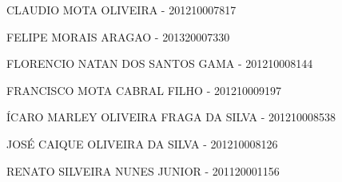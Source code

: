 \clearpage{\centering
\textbf{\textcolor[rgb]{0.078431375,0.09411765,0.13725491}{Componentes}}\textcolor[rgb]{0.078431375,0.09411765,0.13725491}{:}
\par}


\bigskip

{\centering
\textcolor[rgb]{0.078431375,0.09411765,0.13725491}{CLAUDIO MOTA OLIVEIRA - 201210007817}
\par}

{\centering
\textcolor[rgb]{0.078431375,0.09411765,0.13725491}{FELIPE MORAIS ARAGAO - 201320007330}
\par}

{\centering
\textcolor[rgb]{0.078431375,0.09411765,0.13725491}{FLORENCIO NATAN DOS SANTOS GAMA - 201210008144}
\par}

{\centering
\textcolor[rgb]{0.078431375,0.09411765,0.13725491}{FRANCISCO MOTA CABRAL FILHO -  201210009197}
\par}

 {\centering
\textcolor[rgb]{0.078431375,0.09411765,0.13725491}{ÍCARO MARLEY OLIVEIRA FRAGA DA SILVA -  201210008538}
\par}
{\centering
\textcolor[rgb]{0.078431375,0.09411765,0.13725491}{JOSÉ CAIQUE OLIVEIRA DA SILVA - 201210008126}
\par}

{\centering
\textcolor[rgb]{0.078431375,0.09411765,0.13725491}{RENATO SILVEIRA NUNES JUNIOR - 201120001156}
\par}

\bigskip


\bigskip


\bigskip


\bigskip


\bigskip


\bigskip


\bigskip


\bigskip


\bigskip


\bigskip


\bigskip


\bigskip


\bigskip


\bigskip


\bigskip


\bigskip


\bigskip


\bigskip

\clearpage
\bigskip

